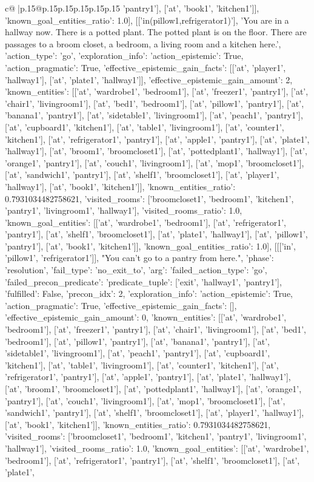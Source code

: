 \documentclass{article}
\begin{document}
{\begin{supertabular}{c@{$\;$}|p{.15\linewidth}@{}p{.15\linewidth}p{.15\linewidth}p{.15\linewidth}p{.15\linewidth}p{.15\linewidth}}
{{{'pantry1'], ['at', 'book1', 'kitchen1']], 'known_goal_entities_ratio': 1.0}}], [['in(pillow1,refrigerator1)'], 'You are in a hallway now. There is a potted plant. The potted plant is on the floor. There are passages to a broom closet, a bedroom, a living room and a kitchen here.', {'action_type': 'go', 'exploration_info': {'action_epistemic': True, 'action_pragmatic': True, 'effective_epistemic_gain_facts': [['at', 'player1', 'hallway1'], ['at', 'plate1', 'hallway1']], 'effective_epistemic_gain_amount': 2, 'known_entities': [['at', 'wardrobe1', 'bedroom1'], ['at', 'freezer1', 'pantry1'], ['at', 'chair1', 'livingroom1'], ['at', 'bed1', 'bedroom1'], ['at', 'pillow1', 'pantry1'], ['at', 'banana1', 'pantry1'], ['at', 'sidetable1', 'livingroom1'], ['at', 'peach1', 'pantry1'], ['at', 'cupboard1', 'kitchen1'], ['at', 'table1', 'livingroom1'], ['at', 'counter1', 'kitchen1'], ['at', 'refrigerator1', 'pantry1'], ['at', 'apple1', 'pantry1'], ['at', 'plate1', 'hallway1'], ['at', 'broom1', 'broomcloset1'], ['at', 'pottedplant1', 'hallway1'], ['at', 'orange1', 'pantry1'], ['at', 'couch1', 'livingroom1'], ['at', 'mop1', 'broomcloset1'], ['at', 'sandwich1', 'pantry1'], ['at', 'shelf1', 'broomcloset1'], ['at', 'player1', 'hallway1'], ['at', 'book1', 'kitchen1']], 'known_entities_ratio': 0.7931034482758621, 'visited_rooms': ['broomcloset1', 'bedroom1', 'kitchen1', 'pantry1', 'livingroom1', 'hallway1'], 'visited_rooms_ratio': 1.0, 'known_goal_entities': [['at', 'wardrobe1', 'bedroom1'], ['at', 'refrigerator1', 'pantry1'], ['at', 'shelf1', 'broomcloset1'], ['at', 'plate1', 'hallway1'], ['at', 'pillow1', 'pantry1'], ['at', 'book1', 'kitchen1']], 'known_goal_entities_ratio': 1.0}}], [[['in', 'pillow1', 'refrigerator1']], "You can't go to a pantry from here.", {'phase': 'resolution', 'fail_type': 'no_exit_to', 'arg': {'failed_action_type': 'go', 'failed_precon_predicate': {'predicate_tuple': ['exit', 'hallway1', 'pantry1'], 'fulfilled': False, 'precon_idx': 2}}, 'exploration_info': {'action_epistemic': True, 'action_pragmatic': True, 'effective_epistemic_gain_facts': [], 'effective_epistemic_gain_amount': 0, 'known_entities': [['at', 'wardrobe1', 'bedroom1'], ['at', 'freezer1', 'pantry1'], ['at', 'chair1', 'livingroom1'], ['at', 'bed1', 'bedroom1'], ['at', 'pillow1', 'pantry1'], ['at', 'banana1', 'pantry1'], ['at', 'sidetable1', 'livingroom1'], ['at', 'peach1', 'pantry1'], ['at', 'cupboard1', 'kitchen1'], ['at', 'table1', 'livingroom1'], ['at', 'counter1', 'kitchen1'], ['at', 'refrigerator1', 'pantry1'], ['at', 'apple1', 'pantry1'], ['at', 'plate1', 'hallway1'], ['at', 'broom1', 'broomcloset1'], ['at', 'pottedplant1', 'hallway1'], ['at', 'orange1', 'pantry1'], ['at', 'couch1', 'livingroom1'], ['at', 'mop1', 'broomcloset1'], ['at', 'sandwich1', 'pantry1'], ['at', 'shelf1', 'broomcloset1'], ['at', 'player1', 'hallway1'], ['at', 'book1', 'kitchen1']], 'known_entities_ratio': 0.7931034482758621, 'visited_rooms': ['broomcloset1', 'bedroom1', 'kitchen1', 'pantry1', 'livingroom1', 'hallway1'], 'visited_rooms_ratio': 1.0, 'known_goal_entities': [['at', 'wardrobe1', 'bedroom1'], ['at', 'refrigerator1', 'pantry1'], ['at', 'shelf1', 'broomcloset1'], ['at', 'plate1', }}}
\end{supertabular}}
\end{document}
